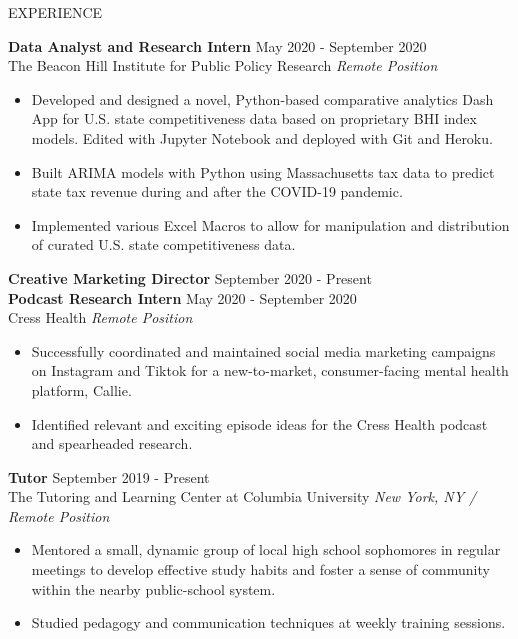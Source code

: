 \documentclass{resume} %
\begin{document}
	\begin{rSection}{EXPERIENCE}
		
		\textbf{Data Analyst and Research Intern} \hfill May 2020 - September 2020\\
		The Beacon Hill Institute for Public Policy Research \hfill \textit{Remote Position}
		\begin{itemize}
			\itemsep -3pt {} 
			\item Developed and designed a novel, Python-based comparative analytics Dash App for U.S. state competitiveness data based on proprietary BHI index models. Edited with Jupyter Notebook and deployed with Git and Heroku. 
			\item Built ARIMA models with Python using Massachusetts tax data to predict state tax revenue during and after the COVID-19 pandemic.
			\item Implemented various Excel Macros to allow for manipulation and distribution of curated U.S. state competitiveness data.
		\end{itemize}
		
		\textbf{Creative Marketing Director} \hfill September 2020 - Present\\
		\textbf{Podcast Research Intern} \hfill May 2020 - September 2020\\
		Cress Health \hfill \textit{Remote Position}
		\begin{itemize}
			\itemsep -3pt {} 
			\item Successfully coordinated and maintained social media marketing campaigns on Instagram and Tiktok for a new-to-market, consumer-facing mental health platform, Callie. 
			\item Identified relevant and exciting episode ideas for the Cress Health podcast and spearheaded research.
		\end{itemize}
	
		\textbf{Tutor} \hfill September 2019 - Present\\
		The Tutoring and Learning Center at Columbia University \hfill \textit{New York, NY / Remote Position}
		\begin{itemize}
			\itemsep -3pt {} 
			\item Mentored a small, dynamic group of local high school sophomores in regular meetings to develop effective study habits and foster a sense of community within the nearby public-school system.  
			\item Studied pedagogy and communication techniques at weekly training sessions.
		\end{itemize}
	

\end{rSection}
\end{document}

